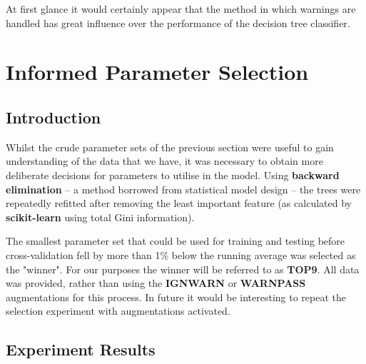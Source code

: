 At first glance it would certainly appear that the method in which warnings are
handled has great influence over the performance of the decision tree
classifier.


\section{Informed Parameter Selection}
\subsection{Introduction}

Whilst the crude parameter sets of the previous section were useful to gain
understanding of the data that we have, it was necessary to obtain more
deliberate decisions for parameters to utilise in the model. Using
\textbf{backward elimination} -- a method borrowed from statistical model design
-- the trees were repeatedly refitted after removing the least important
feature (as calculated by \textbf{scikit-learn} using total Gini information).

The smallest parameter set that could be used for training and testing before
cross-validation fell by more than 1\% below the running average was selected as
the "winner". For our purposes the winner will be referred to as \textbf{TOP9}.
All data was provided, rather than using the \textbf{IGNWARN} or
\textbf{WARNPASS} augmentations for this process. In future it would be
interesting to repeat the selection experiment with augmentations activated.


\subsection{Experiment Results}

